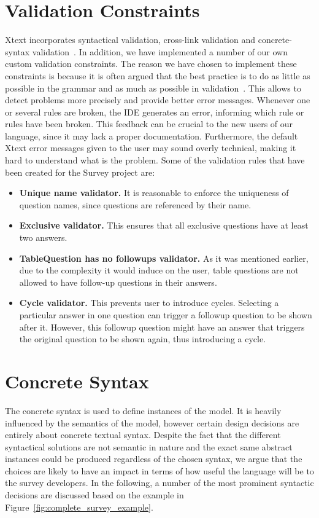 \documentclass[runningheads,a4paper]{llncs}
\begin{document}
\section{Validation Constraints}
\label{sec:constraints}
Xtext incorporates syntactical validation, cross-link validation and concrete-syntax validation~\cite{xtext_doc}. In addition, we have implemented a number of our own custom validation constraints. The reason we have chosen to implement these constraints is because it is often argued that the best practice is to do as little as possible in the grammar and as much as possible in validation~\cite{bettini}. This allows to detect problems more precisely and provide better error messages. Whenever one or several rules are broken, the IDE generates an error, informing which rule or rules have been broken. This feedback can be crucial to the new users of our language, since it may lack a proper documentation. Furthermore, the default Xtext error messages given to the user may sound overly technical, making it hard to understand what is the problem.
Some of the validation rules that have been created for the Survey project are:

\begin{itemize}
	\item \textbf{Unique name validator.} It is reasonable to enforce the uniqueness of question names, since questions are referenced by their name.
	\item \textbf{Exclusive validator.} This ensures that all exclusive questions have at least two answers. 
	\item \textbf{TableQuestion has no followups validator.} As it was mentioned earlier, due to the complexity it would induce on the user, table questions are not allowed to have follow-up questions in their answers.
	\item \textbf{Cycle validator.} This prevents user to introduce cycles. Selecting a particular answer in one question can trigger a followup question to be shown after it. However, this followup question might have an answer that triggers the original question to be shown again, thus introducing a cycle. 
\end{itemize}

\section{Concrete Syntax}
The concrete syntax is used to define instances of the model. It is heavily influenced by the semantics of the model, however certain design decisions are entirely about concrete textual syntax. Despite the fact that the different syntactical solutions are not semantic in nature and the exact same abstract instances could be produced regardless of the chosen syntax, we argue that the choices are likely to have an impact in terms of how useful the language will be to the survey developers. In the following, a number of the most prominent syntactic decisions are discussed based on the example in Figure~\ref{fig:complete_survey_example}.
\end{document}
